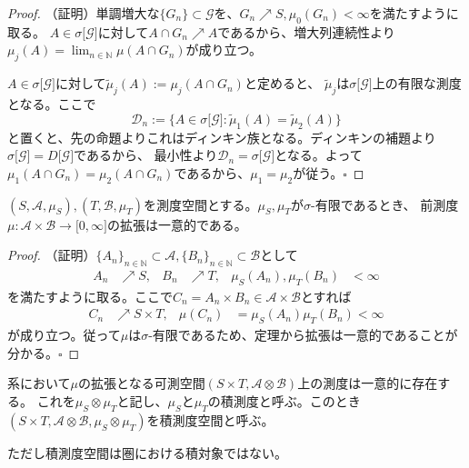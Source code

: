 \documentclass[../root.tex]{subfiles}
\begin{document}
\begin{proof}
（証明）単調増大な$ \lbrace G_{n} \rbrace\subset\mathscr{G} $を、$ G_{n}\nearrow S, \mu_{0}( G_{n} )\lt\infty $を満たすように取る。
$ A\in\sigma\lbrack \mathscr{G} \rbrack $に対して$ A\cap G_{n}\nearrow A $であるから、増大列連続性より$ \mu_{j}( A )=\lim_{n\in\mathbb{N}}\mu( A\cap G_{n} ) $が成り立つ。

$ A\in\sigma\lbrack \mathscr{G} \rbrack $に対して$ \widetilde{\mu}_{j}( A ):=\mu_{j}( A\cap G_{n} ) $と定めると、
$ \widetilde{\mu}_{j} $は$ \sigma\lbrack \mathscr{G} \rbrack $上の有限な測度となる。ここで
\[ \mathscr{D}_{n}:=\lbrace A\in\sigma\lbrack \mathscr{G} \rbrack : \widetilde{\mu}_{1}( A )=\widetilde{\mu}_{2}( A ) \rbrace \]
と置くと、先の命題よりこれはディンキン族となる。ディンキンの補題より$ \sigma\lbrack \mathscr{G} \rbrack=D\lbrack \mathscr{G} \rbrack $であるから、
最小性より$ \mathscr{D}_{n}=\sigma\lbrack \mathscr{G} \rbrack $となる。よって$ \mu_{1}( A\cap G_{n} )=\mu_{2}( A\cap G_{n} ) $であるから、$ \mu_{1}=\mu_{2} $が従う。$ \square $
\end{proof}

\begin{Cor}{}{}
$ ( S, \mathscr{A}, \mu_{S} ), ( T, \mathscr{B}, \mu_{T} ) $を測度空間とする。$ \mu_{S}, \mu_{T} $が$ \sigma $-有限であるとき、
前測度$ \mu\colon\mathscr{A}\times\mathscr{B}\rightarrow\lbrack 0, \infty \rbrack $の拡張は一意的である。
\end{Cor}

\begin{proof}
（証明）$ \lbrace A_{n} \rbrace_{n\in\mathbb{N}}\subset\mathscr{A}, \lbrace B_{n} \rbrace_{n\in\mathbb{N}}\subset\mathscr{B} $として
\begin{align*}
A_{n}&\nearrow S, & B_{n}&\nearrow T, & \mu_{S}( A_{n} ), \mu_{T}( B_{n} )&\lt\infty
\end{align*}
を満たすように取る。ここで$ C_{n}=A_{n}\times B_{n}\in\mathscr{A}\times\mathscr{B} $とすれば
\begin{align*}
C_{n}&\nearrow S\times T, & \mu( C_{n} )&=\mu_{S}( A_{n} )\mu_{T}( B_{n} )\lt\infty
\end{align*}
が成り立つ。従って$ \mu $は$ \sigma $-有限であるため、定理から拡張は一意的であることが分かる。$ \square $
\end{proof}

\begin{Def}{}{}
系において$ \mu $の拡張となる可測空間$ ( S\times T, \mathscr{A}\otimes\mathscr{B} ) $上の測度は一意的に存在する。
これを$ \mu_{S}\otimes\mu_{T} $と記し、$ \mu_{S} $と$ \mu_{T} $の積測度と呼ぶ。このとき$ ( S\times T, \mathscr{A}\otimes\mathscr{B}, \mu_{S}\otimes\mu_{T} ) $を積測度空間と呼ぶ。
\end{Def}

ただし積測度空間は圏における積対象ではない。
\end{document}
